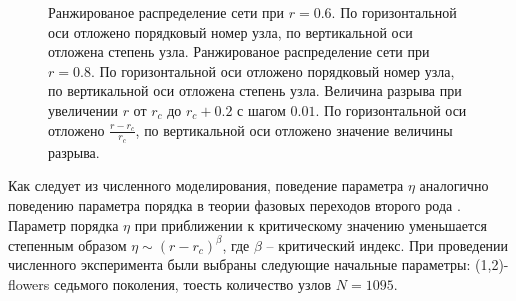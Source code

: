 \documentclass[10pt,aps,pra]{revtex4-1}
\begin{document}
\begin{figure}[H]  

\centering
{}  

\caption{
\label{fig:flowerRank}
 Ранжированое распределение сети при $r=0.6$. По горизонтальной оси отложено порядковый номер узла, по вертикальной оси отложена степень узла.
 Ранжированое распределение сети при $r=0.8$. По горизонтальной оси отложено порядковый номер узла, по вертикальной оси отложена степень узла.
 Величина разрыва при увеличении $r$ от $r_c$ до $r_c + 0.2$ с шагом $0.01$. По горизонтальной оси отложено $\frac{r-r_c}{r_c}$, по вертикальной оси отложено значение величины разрыва.
}
\end{figure}

Как следует из численного моделирования, поведение параметра $\eta$ аналогично поведению параметра порядка в теории фазовых переходов второго рода \cite{Landau}. Параметр порядка $\eta$ при приближении к критическому значению уменьшается степенным образом $\eta \sim (r-r_c)^\beta$, где $\beta$ – критический индекс. 
При проведении численного эксперимента были выбраны следующие начальные параметры: (1,2)-flowers седьмого поколения, тоесть количество узлов $N=1095$.
\end{document}
